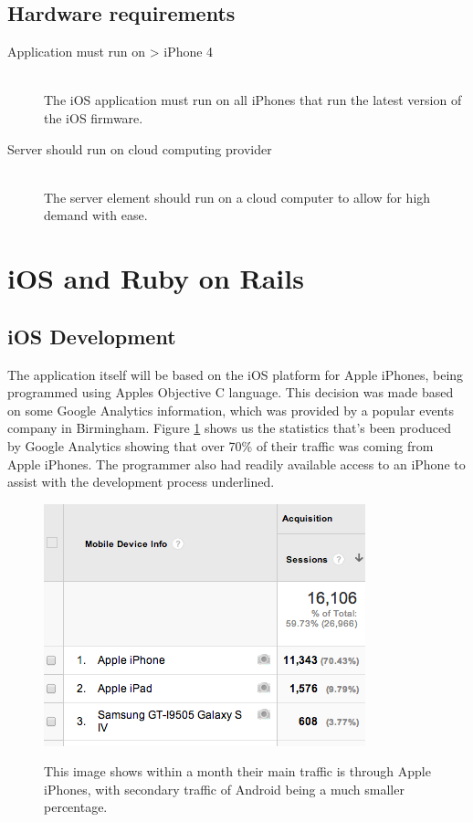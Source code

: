 	\subsection{Hardware requirements}
		\begin{description}
			\item[Application must run on > iPhone 4] \hfill \\
				The iOS application must run on all iPhones that run the latest version of the iOS firmware.
			\item[Server should run on cloud computing provider] \hfill \\
				The server element should run on a cloud computer to allow for high demand with ease. 
		\end{description}

\section{iOS and Ruby on Rails}

	\subsection{iOS Development}
	The application itself will be based on the iOS platform for Apple iPhones, being programmed using Apples Objective C language. This decision was made based on some Google Analytics information, which was provided by a popular events company in Birmingham. Figure \ref{fig:googleAnalyticsRainbow} shows us the statistics that's been produced by Google Analytics showing that over 70\% of their traffic was coming from Apple iPhones. The programmer also had readily available access to an iPhone to assist with the development process underlined. 

	\begin{figure}[h] %
		\caption[Image of Google Analytics for popular events site]{This image shows within a month their main traffic is through Apple iPhones, with secondary traffic of Android being a much smaller percentage. }
		\centering
		\includegraphics[scale=1]{Images/google-analytics}
		\label{fig:googleAnalyticsRainbow}
	\end{figure}

